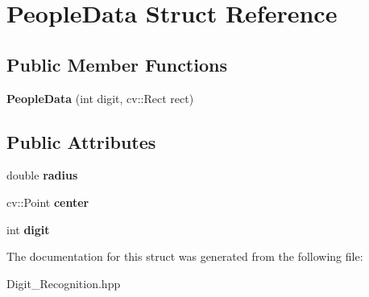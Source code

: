 \hypertarget{struct_people_data}{}\section{People\+Data Struct Reference}
\label{struct_people_data}
\subsection*{Public Member Functions}
\begin{DoxyCompactItemize}
\item 
\mbox{\label{struct_people_data_a12533080887faeb2f9819d4c45a54424}} 
{\bfseries People\+Data} (int digit, cv\+::\+Rect rect)
\end{DoxyCompactItemize}
\subsection*{Public Attributes}
\begin{DoxyCompactItemize}
\item 
\mbox{\label{struct_people_data_a8b6df3ca122413f40a7ef6b662589b9e}} 
double {\bfseries radius}
\item 
\mbox{\label{struct_people_data_a9744c97bd0d9b4582452eb8afec15b05}} 
cv\+::\+Point {\bfseries center}
\item 
\mbox{\label{struct_people_data_ac67414ff2db4d485a431b7a93cc02298}} 
int {\bfseries digit}
\end{DoxyCompactItemize}


The documentation for this struct was generated from the following file\+:\begin{DoxyCompactItemize}
\item 
Digit\+\_\+\+Recognition.\+hpp\end{DoxyCompactItemize}
